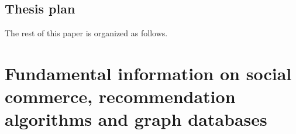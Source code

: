 \documentclass[12pt]{report}
\begin{document}



\section{Thesis plan}

The rest of this paper is organized as follows.






\chapter{Fundamental information on social commerce, recommendation algorithms and graph databases}
\label{fundamental_info}
\end{document}

